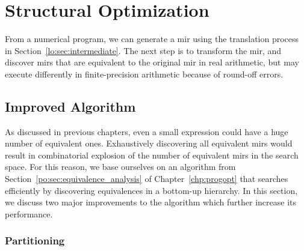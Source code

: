 \section{Structural Optimization}
\label{lo:sec:structural_optimization}

From a numerical program, we can generate a \gls{mir} using the translation
process in Section~\ref{lo:sec:intermediate}.  The next step is to transform
the \gls{mir}, and discover \glspl{mir} that are equivalent to the original
\gls{mir} in real arithmetic, but may execute differently in finite-precision
arithmetic because of round-off errors.

\subsection{Improved Algorithm}
\label{lo:sub:algorithm}


As discussed in previous chapters, even a small expression could have a huge
number of equivalent ones.  Exhaustively discovering all equivalent \glspl{mir}
would result in combinatorial explosion of the number of equivalent \glspl{mir}
in the search space.  For this reason, we base ourselves on an algorithm from
Section~\ref{po:sec:equivalence_analysis} of Chapter~\ref{chp:progopt} that
searches efficiently by discovering equivalences in a bottom-up hierarchy.  In
this section, we discuss two major improvements to the algorithm which further
increase its performance.

\subsubsection{Partitioning}

